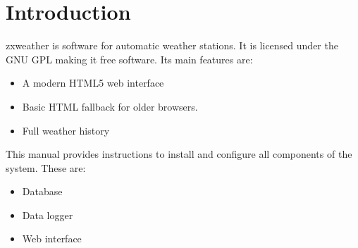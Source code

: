 \documentclass[a4paper,10pt,draft]{book}
\newcommand{\partnumber}{\ifthenelse{\isundefined{\projectnum}}{}{\projectnum-\docnum	\ifthenelse{\equal{\docrev}{001}}{}{.\docrev}}}
\begin{document}

\ifthenelse{\isundefined{\ordernumber}}{

\title{\doctitle{} - \docsubtitle}
\author{\docauthor}
}{

\title{\doctitle}
\subtitle{\docsubtitle}
\titleabstract{\docabstract}
\ordernumber{\partnumber}
\updateinfo{\docupdateinfo}
\osinfo{\docosver}
\swversion{\docswver}
\titlecopyright{\doccopyright}
\licensestatement{\doclicense}
}
\date{\docdate}

\maketitle

\clearpage

\tableofcontents
\clearpage



\chapter{Introduction}
\setcounter{page}{1}

zxweather is software for automatic weather stations. It is licensed under the GNU GPL making it free software. Its main features are:
\begin{itemize}
\item A modern HTML5 web interface
\item Basic HTML fallback for older browsers.
\item Full weather history
\end{itemize}

This manual provides instructions to install and configure all components of the system. These are:
\begin{itemize}
\item Database
\item Data logger
\item Web interface
\end{itemize}
\end{document}
